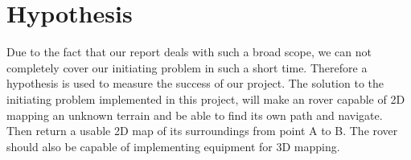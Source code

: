 \section{Hypothesis}

Due to the fact that our report deals with such a broad scope, we can not completely cover our initiating problem in such a short time. Therefore a hypothesis is used to measure the success of our project.
The solution to the initiating problem implemented in this project, will make an rover capable of 2D mapping an unknown terrain and be able to find its own path and navigate. Then return a usable 2D map of its surroundings from point A to B. The rover should also be capable of implementing equipment for 3D mapping.